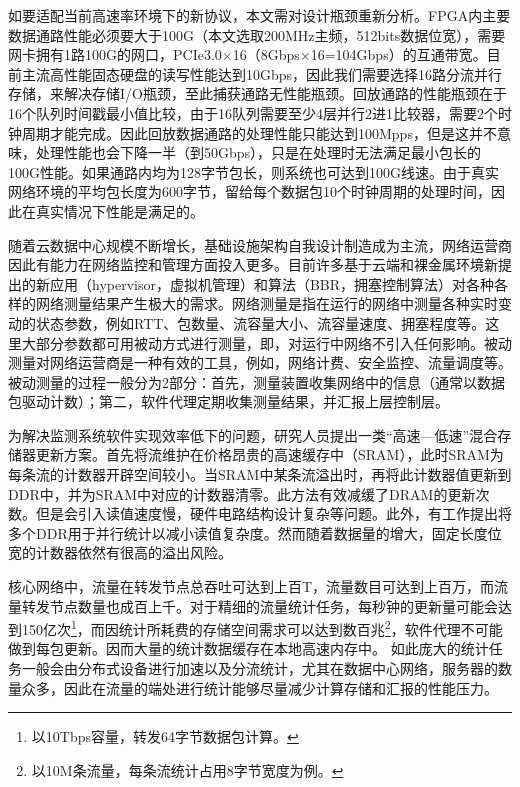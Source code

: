 如要适配当前高速率环境下的新协议，本文需对设计瓶颈重新分析。FPGA内主要数据通路性能必须要大于100G（本文选取200MHz主频，512bits数据位宽），需要网卡拥有1路100G的网口，PCIe3.0$ \times $16（8Gbps$\times$16=104Gbps）的互通带宽。目前主流高性能固态硬盘的读写性能达到10Gbps，因此我们需要选择16路分流并行存储，来解决存储I/O瓶颈，至此捕获通路无性能瓶颈。回放通路的性能瓶颈在于16个队列时间戳最小值比较，由于16队列需要至少4层并行2进1比较器，需要2个时钟周期才能完成。因此回放数据通路的处理性能只能达到100Mpps，但是这并不意味，处理性能也会下降一半（到50Gbps），只是在处理时无法满足最小包长的100G性能。如果通路内均为128字节包长，则系统也可达到100G线速。由于真实网络环境的平均包长度为600字节，留给每个数据包10个时钟周期的处理时间，因此在真实情况下性能是满足的。



\label{chap35}

\label{chap351}

随着云数据中心规模不断增长，基础设施架构自我设计制造成为主流，网络运营商因此有能力在网络监控和管理方面投入更多。目前许多基于云端和裸金属环境新提出的新应用（hypervisor，虚拟机管理）和算法（BBR，拥塞控制算法）对各种各样的网络测量结果产生极大的需求。网络测量是指在运行的网络中测量各种实时变动的状态参数，例如RTT、包数量、流容量大小、流容量速度、拥塞程度等。这里大部分参数都可用被动方式进行测量，即，对运行中网络不引入任何影响。被动测量对网络运营商是一种有效的工具，例如，网络计费、安全监控、流量调度等。被动测量的过程一般分为2部分：首先，测量装置收集网络中的信息（通常以数据包驱动计数）；第二，软件代理定期收集测量结果，并汇报上层控制层。


为解决监测系统软件实现效率低下的问题，研究人员提出一类“高速---低速”混合存储器更新方案。首先将流维护在价格昂贵的高速缓存中（SRAM），此时SRAM为每条流的计数器开辟空间较小。当SRAM中某条流溢出时，再将此计数器值更新到DDR中，并为SRAM中对应的计数器清零。此方法有效减缓了DRAM的更新次数。但是会引入读值速度慢，硬件电路结构设计复杂等问题。此外，有工作提出将多个DDR用于并行统计以减小读值复杂度。然而随着数据量的增大，固定长度位宽的计数器依然有很高的溢出风险。

核心网络中，流量在转发节点总吞吐可达到上百T，流量数目可达到上百万，而流量转发节点数量也成百上千。对于精细的流量统计任务，每秒钟的更新量可能会达到150亿次\footnote{以10Tbps容量，转发64字节数据包计算。}，而因统计所耗费的存储空间需求可以达到数百兆\footnote{以10M条流量，每条流统计占用8字节宽度为例。}，软件代理不可能做到每包更新。因而大量的统计数据缓存在本地高速内存中。
如此庞大的统计任务一般会由分布式设备进行加速以及分流统计，尤其在数据中心网络，服务器的数量众多，因此在流量的端处进行统计能够尽量减少计算存储和汇报的性能压力。

